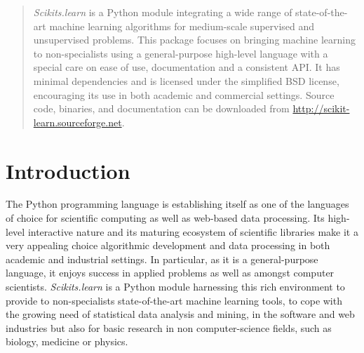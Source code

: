 \documentclass[twoside,11pt]{article}
\begin{document}
\maketitle

\begin{abstract}
\emph{Scikits.learn} is a Python module integrating
a wide range of state-of-the-art machine learning algorithms for
medium-scale supervised and unsupervised problems. This package
focuses on bringing machine learning to non-specialists using a
general-purpose high-level language with a special care on ease of use,
documentation and a consistent API.
%
It has minimal dependencies and is licensed under the simplified BSD
license, encouraging its use in both academic and commercial settings. Source
code, binaries, and documentation can be downloaded from
\url{http://scikit-learn.sourceforge.net}.

\end{abstract}





\section{Introduction}

The Python programming language is establishing itself as one of the
languages of choice for scientific computing as well as web-based data
processing. Its high-level interactive nature and its maturing ecosystem
of scientific libraries \citep{cise2007,cise2011} make it a very
appealing choice algorithmic development and data processing in both
academic and industrial settings. In particular, as it is a
general-purpose language, it enjoys success in applied problems as well
as amongst computer scientists.
%
{\sl Scikits.learn} is a Python module harnessing this rich environment
to provide to non-specialists state-of-the-art machine learning tools, to
cope with the growing need of statistical data analysis and mining, in
the software and web industries but also for basic research in non
computer-science fields, such as biology, medicine or physics.
\end{document}
